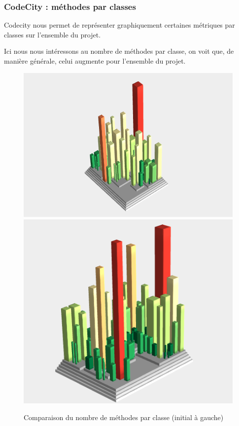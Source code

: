 \documentclass[a4paper,12pt]{report} %
\begin{document}
\subsubsection{CodeCity : méthodes par classes}
Codecity nous permet de représenter graphiquement certaines métriques
par classes sur l'ensemble du projet.

Ici nous nous intéressons au nombre de méthodes par classe, on voit
que, de manière générale, celui augmente pour l'ensemble du projet.

\begin{figure}[!h]
\includegraphics[scale=0.5]{ressources/final_initial_declared_methods}\includegraphics[scale=0.5]{ressources/final_new_declared_methods}\caption{Comparaison du nombre de méthodes par classe (initial à gauche)}


\end{figure}
\end{document}
